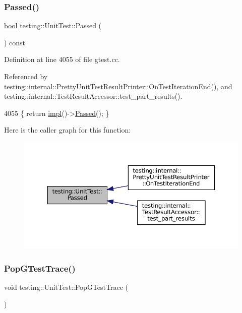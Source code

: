 \subsubsection{\texorpdfstring{Passed()}{Passed()}}
{\footnotesize\ttfamily \hyperlink{classbool}{bool} testing\+::\+Unit\+Test\+::\+Passed (\begin{DoxyParamCaption}{ }\end{DoxyParamCaption}) const}



Definition at line 4055 of file gtest.\+cc.



Referenced by testing\+::internal\+::\+Pretty\+Unit\+Test\+Result\+Printer\+::\+On\+Test\+Iteration\+End(), and testing\+::internal\+::\+Test\+Result\+Accessor\+::test\+\_\+part\+\_\+results().


\begin{DoxyCode}
4055 \{ \textcolor{keywordflow}{return} \hyperlink{classtesting_1_1UnitTest_a4df5d11a58affb337d7fa62eaa07690e}{impl}()->\hyperlink{classtesting_1_1internal_1_1UnitTestImpl_ae8e461369acfec902da382bc02297fe5}{Passed}(); \}
\end{DoxyCode}
Here is the caller graph for this function\+:
\nopagebreak
\begin{figure}[H]
\begin{center}
\leavevmode
\includegraphics[width=350pt]{classtesting_1_1UnitTest_a7c9b327bc14cb8a282c789dc6513a55b_icgraph}
\end{center}
\end{figure}
\mbox{\label{classtesting_1_1UnitTest_a70b3e3282778bc9a36520fe0a8be3c57}} 
\subsubsection{\texorpdfstring{Pop\+G\+Test\+Trace()}{PopGTestTrace()}}
{\footnotesize\ttfamily void testing\+::\+Unit\+Test\+::\+Pop\+G\+Test\+Trace (\begin{DoxyParamCaption}{ }\end{DoxyParamCaption})\hspace{0.3cm}{\ttfamily [private]}}



